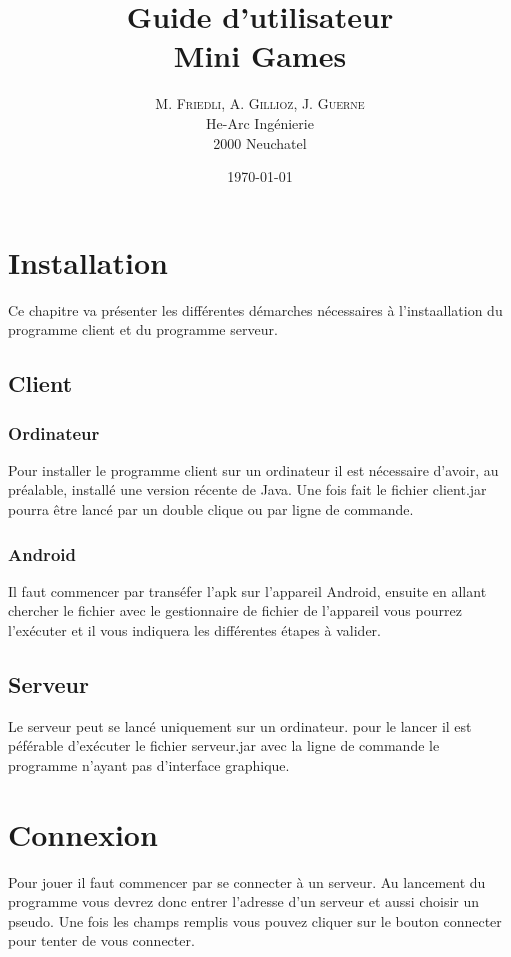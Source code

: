 \documentclass{report}
\title{\Huge Guide d'utilisateur \\ \huge Mini Games }
\author{M. \textsc{Friedli}, A. \textsc{Gillioz}, J. \textsc{Guerne}\\
He-Arc Ingénierie\\
2000 Neuchatel}
\date{\today{}}
\begin{document}
\maketitle

\chapter{Installation}
Ce chapitre va présenter les différentes démarches nécessaires à l'instaallation du
programme client et du programme serveur.
\section{Client}

\subsection{Ordinateur}
Pour installer le programme client sur un ordinateur il est nécessaire d'avoir, au préalable, installé une version récente de Java.
Une fois fait le fichier client.jar pourra être lancé par un double clique ou par ligne de commande.

\subsection{Android}
Il faut commencer par transéfer l'apk sur l'appareil Android, ensuite en allant chercher le fichier avec le gestionnaire de fichier de
l'appareil vous pourrez l'exécuter et il vous indiquera les différentes étapes à valider.

\section{Serveur}
Le serveur peut se lancé uniquement sur un ordinateur. pour le lancer il est péférable d'exécuter le fichier serveur.jar avec la ligne de commande le programme n'ayant
pas d'interface graphique.


\chapter{Connexion}
Pour jouer il faut commencer par se connecter à un serveur.
Au lancement du programme vous devrez donc entrer l'adresse d'un serveur et aussi choisir un pseudo. Une fois les champs remplis vous pouvez cliquer sur le bouton connecter pour tenter de vous connecter.
\end{document}
